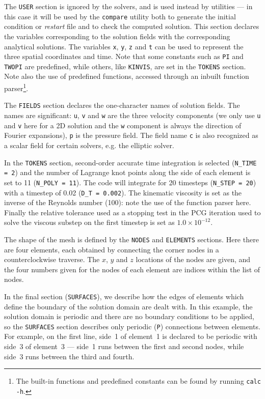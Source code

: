 \documentclass[11pt,a4paper]{report}
\begin{document}
The \texttt{USER} section is ignored by the solvers, and is used
instead by utilities --- in this case it will be used by the
\texttt{compare} utility both to generate the initial condition or
\textsl{restart} file and to check the computed solution.  This
section declares the variables corresponding to the solution fields
with the corresponding analytical solutions.  The variables
\texttt{x}, \texttt{y}, \texttt{z} and \texttt{t} can be used to
represent the three spatial coordinates and time.  Note that some
constants such as \texttt{PI} and \texttt{TWOPI} are predefined, while
others, like \texttt{KINVIS}, are set in the \texttt{TOKENS} section.
Note also the use of predefined functions, accessed through an inbuilt
function parser\footnote{The built-in functions and predefined constants
can be found by running \texttt{calc -h}.}.

The \texttt{FIELDS} section declares the one-character names of
solution fields.  The names are significant: \texttt{u}, \texttt{v}
and \texttt{w} are the three velocity components (we only use
\texttt{u} and \texttt{v} here for a 2D solution and the \texttt{w}
component is always the direction of Fourier expansions), \texttt{p}
is the pressure field.  The field name \texttt{c} is also recognized
as a scalar field for certain solvers, e.g. the elliptic solver.

In the \texttt{TOKENS} section, second-order accurate time integration
is selected (\verb+N_TIME = 2+) and the number of Lagrange knot points
along the side of each element is set to 11 (\verb+N_POLY = 11+).  The
code will integrate for 20 timesteps (\verb+N_STEP = 20+) with a
timestep of 0.02 (\verb+D_T = 0.002+).  The kinematic viscosity is
set as the inverse of the Reynolds number (100): note the use of the
function parser here.  Finally the relative tolerance used as a
stopping test in the PCG iteration used to solve the viscous substep
on the first timestep is set as $1.0\times10^{-12}$.

The shape of the mesh is defined by the \texttt{NODES} and
\texttt{ELEMENTS} sections.  Here there are four elements, each
obtained by connecting the corner nodes in a counterclockwise
traverse.  The $x$, $y$ and $z$ locations of the nodes are given, and
the four numbers given for the nodes of each element are indices
within the list of nodes.

In the final section (\texttt{SURFACES}), we describe how the edges of
elements which define the boundary of the solution domain are dealt
with.  In this example, the solution domain is periodic and there are
no boundary conditions to be applied, so the \texttt{SURFACES} section
describes only periodic (\verb+P+) connections between elements.  For
example, on the first line, side~1 of element~1 is declared to be
periodic with side~3 of element~3 --- side~1 runs between the first
and second nodes, while side~3 runs between the third and fourth.
\end{document}
